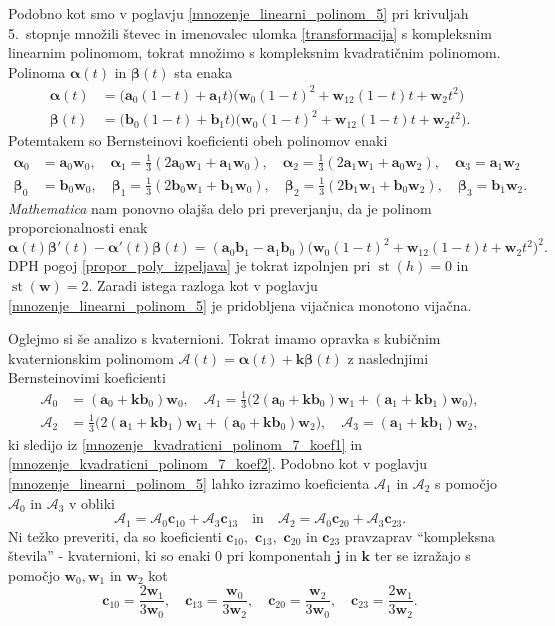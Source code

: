 \documentclass[12pt,a4paper,twoside]{article}
\theoremstyle{definition} %
\theoremstyle{plain} %
\theoremstyle{primerstyle}
\numberwithin{equation}{section}  %
\newcommand{\aV}{\mathbf{a}}
\newcommand{\bV}{\mathbf{b}}
\newcommand{\cV}{\mathbf{c}}
\newcommand{\jV}{\mathbf{j}}
\newcommand{\kV}{\mathbf{k}}
\newcommand{\wV}{\mathbf{w}}
\newcommand{\AQ}{\mathcal{A}}
\newcommand{\balpha}{\boldsymbol \alpha}
\newcommand{\bbeta}{\boldsymbol \beta}
\DeclareMathOperator{\st}{st}
\begin{document}
Podobno kot smo v poglavju \ref{mnozenje_linearni_polinom_5} pri krivuljah 5.\ stopnje množili števec in imenovalec ulomka \eqref{transformacija} s kompleksnim linearnim polinomom, tokrat množimo s kompleksnim kvadratičnim polinomom. Polinoma $\balpha(t)$ in $\bbeta(t)$ sta enaka
\begin{align}
	\balpha(t)&=\big(\aV_0(1-t)+\aV_1t\big)\big(\wV_0(1-t)^2+\wV_12(1-t)t+\wV_2t^2\big)\nonumber\\
	\bbeta(t)&=\big(\bV_0(1-t)+\bV_1t\big)\big(\wV_0(1-t)^2+\wV_12(1-t)t+\wV_2t^2\big).
\end{align}
Potemtakem so Bernsteinovi koeficienti obeh polinomov enaki
\begin{align}
	\balpha_0&=\aV_0\wV_0,\quad\balpha_1=\frac{1}{3}(2\aV_0\wV_1+\aV_1\wV_0),\quad\balpha_2=\frac{1}{3}(2\aV_1\wV_1+\aV_0\wV_2),\quad\balpha_3=\aV_1\wV_2\label{mnozenje_kvadraticni_polinom_7_koef1}\\
	\bbeta_0&=\bV_0\wV_0,\quad\bbeta_1=\frac{1}{3}(2\bV_0\wV_1+\bV_1\wV_0),\quad\bbeta_2=\frac{1}{3}(2\bV_1\wV_1+\bV_0\wV_2),\quad\bbeta_3=\bV_1\wV_2.\label{mnozenje_kvadraticni_polinom_7_koef2}
\end{align}
\emph{Mathematica} nam ponovno olajša delo pri preverjanju, da je polinom proporcionalnosti enak
\begin{equation*}
	\balpha(t)\bbeta'(t)-\balpha'(t)\bbeta(t)=(\aV_0\bV_1-\aV_1\bV_0)\big(\wV_0(1-t)^2+\wV_12(1-t)t+\wV_2t^2\big)^2.
\end{equation*}
DPH pogoj \eqref{propor_poly_izpeljava} je tokrat izpolnjen pri $\st(h)=0$ in $\st(\wV)=2.$ Zaradi istega razloga kot v poglavju \ref{mnozenje_linearni_polinom_5} je pridobljena vijačnica monotono vijačna.

Oglejmo si še analizo s kvaternioni. Tokrat imamo opravka s kubičnim kvaternionskim polinomom $\AQ(t)=\balpha(t)+\kV\bbeta(t)$ z naslednjimi Bernsteinovimi koeficienti
\begin{align*}
	\AQ_0&=(\aV_0+\kV\bV_0)\wV_0,\quad\AQ_1=\frac{1}{3}\big(2(\aV_0+\kV\bV_0)\wV_1+(\aV_1+\kV\bV_1)\wV_0\big),\\
	\AQ_2&=\frac{1}{3}\big(2(\aV_1+\kV\bV_1)\wV_1+(\aV_0+\kV\bV_0)\wV_2\big),\quad\AQ_3=(\aV_1+\kV\bV_1)\wV_2,
\end{align*}
ki sledijo iz \eqref{mnozenje_kvadraticni_polinom_7_koef1} in \eqref{mnozenje_kvadraticni_polinom_7_koef2}. Podobno kot v poglavju \ref{mnozenje_linearni_polinom_5} lahko izrazimo koeficienta $\AQ_1$ in $\AQ_2$ s pomočjo $\AQ_0$ in $\AQ_3$ v obliki
\begin{equation}
	\AQ_1=\AQ_0\cV_{10}+\AQ_3\cV_{13}\quad\text{in}\quad\AQ_2=\AQ_0\cV_{20}+\AQ_3\cV_{23}.
\end{equation}
Ni težko preveriti, da so koeficienti $\cV_{10},$ $\cV_{13},$ $\cV_{20}$ in $\cV_{23}$ pravzaprav ``kompleksna števila'' - kvaternioni, ki so enaki 0 pri komponentah $\jV$ in $\kV$ ter se izražajo s pomočjo $\wV_0,\wV_1$ in $\wV_2$ kot
\begin{equation}
	\cV_{10}=\frac{2\wV_1}{3\wV_0},\quad\cV_{13}=\frac{\wV_0}{3\wV_2},\quad\cV_{20}=\frac{\wV_2}{3\wV_0},\quad\cV_{23}=\frac{2\wV_1}{3\wV_2}.
\end{equation}
\end{document}
